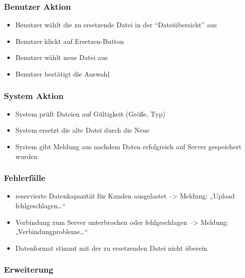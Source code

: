 \documentclass[a4paper,12pt]{article}
\begin{document}
\subsubsection{Benutzer Aktion}\label{benutzer-aktion-12}

\begin{itemize}

\item
  Benutzer wählt die zu ersetzende Datei in der ``Dateiübersicht'' aus
\item
  Benutzer klickt auf Ersetzen-Button
\item
  Benutzer wählt neue Datei aus
\item
  Benutzer bestätigt die Auswahl
\end{itemize}

\subsubsection{System Aktion}\label{system-aktion-12}

\begin{itemize}

\item
  System prüft Dateien auf Gültigkeit (Größe, Typ)
\item
  System ersetzt die alte Datei durch die Neue
\item
  System gibt Meldung aus nachdem Daten erfolgreich auf Server
  gespeichert wurden
\end{itemize}

\subsubsection{Fehlerfälle}\label{fehlerfalle-12}

\begin{itemize}

\item
  reservierte Datenkapazität für Kunden ausgelastet --\textgreater{}
  Meldung: „Upload fehlgeschlagen\ldots{}``
\item
  Verbindung zum Server unterbrochen oder fehlgeschlagen
  --\textgreater{} Meldung: „Verbindungprobleme\ldots{}``
\item
  Datenformat stimmt mit der zu ersetzenden Datei nicht überein
\end{itemize}

\subsubsection{Erweiterung}\label{erweiterung-12}
\end{document}
